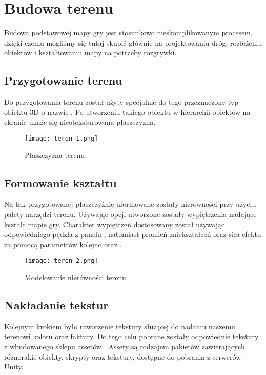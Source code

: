 \section{Budowa terenu}\label{sec:budowa_terenu}
Budowa podstawowej mapy gry jest stosunkowo nieskomplikowanym procesem, dzięki czemu mogliśmy się tutaj skupić głównie na projektowaniu dróg, rozłożeniu obiektów i kształtowaniu mapy na potrzeby rozgrywki.

\subsection{Przygotowanie terenu}

    Do przygotowania terenu został użyty specjalnie do tego przeznaczony typ obiektu 3D o nazwie . Po utworzeniu takiego obiektu w hierarchii obiektów na ekranie ukaże się nieoteksturowana płaszczyzna.

    \begin{figure}[H]
    \texttt{[image: teren\_1.png]}
    \caption{Płaszczyzna terenu}
    \end{figure}

\subsection{Formowanie kształtu} 

    Na tak przygotowanej płaszczyźnie uformowane zostały nierówności przy użyciu palety narzędzi terenu. Używając opcji  utworzone zostały wypiętrzenia nadające kształt mapie gry. Charakter wypiętrzeń dostosowany został używając odpowiedniego pędzla z panelu , natomiast promień zniekształceń oraz siła efektu za pomocą parametrów kolejno  oraz .

    \begin{figure}[H]
    \texttt{[image: teren\_2.png]}
    \caption{Modelowanie nierówności terenu}
    \end{figure}

\subsection{Nakładanie tekstur}

    Kolejnym krokiem było utworzenie tekstury służącej do nadaniu naszemu terenowi koloru oraz faktury. Do tego celu pobrane zostały odpowiednie tekstury z wbudowanego sklepu assetów . Assety są rodzajem pakietów zawierających różnorakie obiekty, skrypty oraz tekstury, dostępne do pobrania z serwerów Unity.

